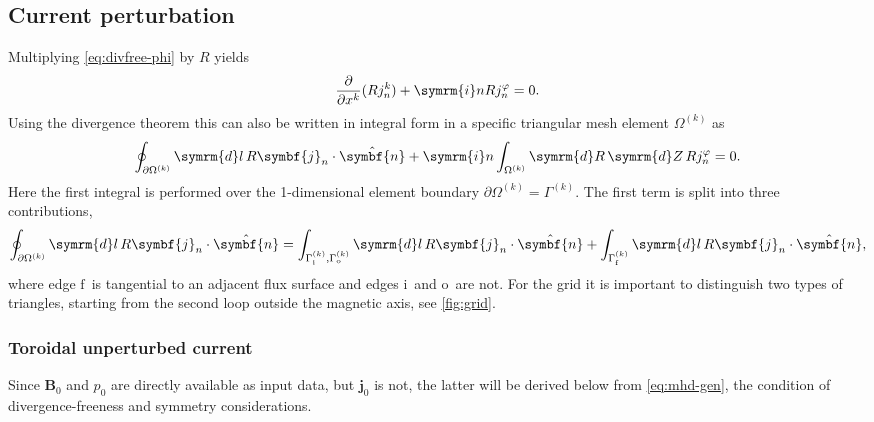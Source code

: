 \documentclass[a4paper, 10pt, english]{article}
\let\temp\varrho
\let\varrho\rho
\let\rho\temp
\let\temp\vartheta
\let\vartheta\theta
\let\theta\temp
\let\temp\varphi
\let\varphi\phi
\let\phi\temp
\let\vec\symbf
\newcommand*\diff{\ensuremath{\symrm{d}}}  %
\newcommand*\im{\ensuremath{\symrm{i}}}  %
\newcommand*\pd[2][]{\ensuremath{\frac{\partial #1}{\partial #2}}}  %
\newcommand*\fs{\ensuremath{\textrm{f}}}  %
\newcommand*\inw{\ensuremath{\textrm{i}}}  %
\newcommand*\out{\ensuremath{\textrm{o}}}  %
\begin{document}
\subsection{Current perturbation}

Multiplying \cref{eq:divfree-phi} by $R$ yields
\begin{gather}
  \pd{x^{k}} (R j_{n}^{k}) + \im n R j_{n}^{\phi} = 0.
\end{gather}
Using the divergence theorem this can also be written in integral form in a specific triangular mesh element $\Omega^{(k)}$ as
\begin{gather}
  \oint_{\partial \Omega^{(k)}} \diff l \, R \vec{j}_{n} \cdot \hat{\vec{n}} + \im n \int_{\Omega^{(k)}} \diff R \, \diff Z \, R j_{n}^{\phi} = 0.
\end{gather}
Here the first integral is performed over the 1-dimensional element boundary $\partial \Omega^{(k)} = \Gamma^{(k)}$. The first term is split into three contributions,
\begin{gather}
  \oint_{\partial \Omega^{(k)}} \diff l \, R \vec{j}_{n} \cdot \hat{\vec{n}} = \int_{\Gamma_{\inw}^{(k)}, \Gamma_{\out}^{(k)}} \diff l \, R \vec{j}_{n} \cdot \hat{\vec{n}} + \int_{\Gamma_{\fs}^{(k)}} \diff l \, R \vec{j}_{n} \cdot \hat{\vec{n}},
\end{gather}
where edge \fs\ is tangential to an adjacent flux surface and edges \inw\ and \out\ are not. For the grid it is important to distinguish two types of triangles, starting from the second loop outside the magnetic axis, see \cref{fig:grid}.

\subsubsection{Toroidal unperturbed current}

Since $\vec{B}_{0}$ and $p_{0}$ are directly available as input data, but $\vec{j}_{0}$ is not, the latter will be derived below from \cref{eq:mhd-gen}, the condition of divergence-freeness and symmetry considerations.
\end{document}
